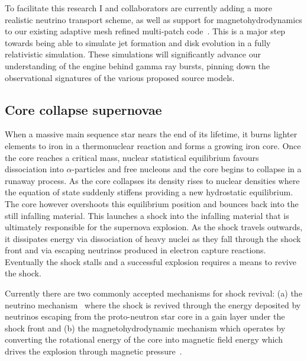 \documentclass[12pt]{article}
\begin{document}

To facilitate this research I and collaborators are currently adding a more
realistic neutrino
transport scheme, as well as support for magnetohydrodynamics to our existing
adaptive mesh refined multi-patch code~\cite{all:mpmhdnu}. This is a major
step towards being able to simulate jet formation and disk evolution in a
fully relativistic simulation. These simulations will significantly advance
our understanding of the engine behind gamma ray bursts, pinning down the
observational signatures of the various proposed source models. 

\subsection{Core collapse supernovae}
When a massive main sequence star nears the end of its lifetime, it burns
lighter elements to iron in a thermonuclear reaction and forms a growing 
iron core. Once the core reaches
a critical mass, nuclear statistical equilibrium favours dissociation into
$\alpha$-particles and free nucleons and the core begins to collapse in a
runaway process.
As the core collapses its density rises to nuclear densities where the
equation of state suddenly stiffens providing a new hydrostatic equilibrium.
The core however overshoots this equilibrium position and bounces back into
the still infalling material. This launches a shock into the infalling
material that is ultimately responsible for the supernova
explosion. As the shock travels outwards, it dissipates energy via
dissociation of heavy nuclei  as they fall through the shock front and
via escaping neutrinos produced in electron capture reactions. Eventually
the shock stalls and a successful explosion requires a means to revive the
shock. 

Currently there are two commonly accepted mechanisms for shock revival:
(a) the neutrino mechanism~\cite{1985nuas.conf..422W} %
where the shock is revived through the energy deposited by
neutrinos escaping from the proto-neutron star core in a gain layer under the
shock front and (b) the magnetohydrodynamic mechanism which operates by
converting the rotational energy of the core into magnetic field energy which
drives the explosion through magnetic
pressure~\cite{Janka:2012wk,Burrows:07b}.
\end{document}
